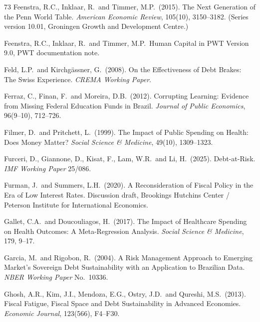 \documentclass[11pt,a4paper]{article}
\begin{document}
\begin{thebibliography}{73}
 Feenstra, R.C., Inklaar, R.\ and Timmer, M.P.\ (2015). The Next Generation of the Penn World Table. \textit{American Economic Review}, 105(10), 3150--3182. (Series version 10.01, Groningen Growth and Development Centre.)

 Feenstra, R.C., Inklaar, R.\ and Timmer, M.P.\ Human Capital in PWT Version 9.0, PWT documentation note.

 Feld, L.P.\ and Kirchg\"assner, G.\ (2008). On the Effectiveness of Debt Brakes: The Swiss Experience. \textit{CREMA Working Paper}.

 Ferraz, C., Finan, F.\ and Moreira, D.B.\ (2012). Corrupting Learning: Evidence from Missing Federal Education Funds in Brazil. \textit{Journal of Public Economics}, 96(9--10), 712--726.

 Filmer, D.\ and Pritchett, L.\ (1999). The Impact of Public Spending on Health: Does Money Matter? \textit{Social Science \& Medicine}, 49(10), 1309--1323.

 Furceri, D., Giannone, D., Kisat, F., Lam, W.R.\ and Li, H.\ (2025). Debt-at-Risk. \textit{IMF Working Paper} 25/086.

 Furman, J.\ and Summers, L.H.\ (2020). A Reconsideration of Fiscal Policy in the Era of Low Interest Rates. Discussion draft, Brookings Hutchins Center / Peterson Institute for International Economics.

 Gallet, C.A.\ and Doucouliagos, H.\ (2017). The Impact of Healthcare Spending on Health Outcomes: A Meta-Regression Analysis. \textit{Social Science \& Medicine}, 179, 9--17.

 Garcia, M.\ and Rigobon, R.\ (2004). A Risk Management Approach to Emerging Market's Sovereign Debt Sustainability with an Application to Brazilian Data. \textit{NBER Working Paper} No.\ 10336.

 Ghosh, A.R., Kim, J.I., Mendoza, E.G., Ostry, J.D.\ and Qureshi, M.S.\ (2013). Fiscal Fatigue, Fiscal Space and Debt Sustainability in Advanced Economies. \textit{Economic Journal}, 123(566), F4--F30.


\end{thebibliography}
\end{document}

